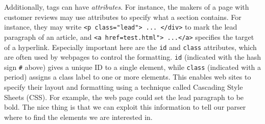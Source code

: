 

Additionally, tags can have \emph{attributes}. For instance, the
makers of a page with customer reviews may use attributes to specify
what a section contains. For instance, they may write
\texttt{<p class="lead"> ... </div>}  to mark the lead paragraph of an article,
and \texttt{<a href=test.html"> ...</a>} specifies the target of a hyperlink.
Especially important here are the \texttt{\small{id}} and \texttt{\small{class}} attributes,
which are often used by webpages to control the formatting.
\texttt{\small{id}} (indicated with the hash sign \texttt{\small{\#}} above) gives a unique ID to a single element,
while \texttt{\small{class}} (indicated with a period) assigns a class label to one or more elements.
This enables web sites to specify their layout and formatting using a technique called Cascading Style Sheets (CSS).
For example, the web page could set the lead paragraph to be bold.
The nice thing is that we can exploit
this information to tell our parser where to find the elements we
are interested in.

%




